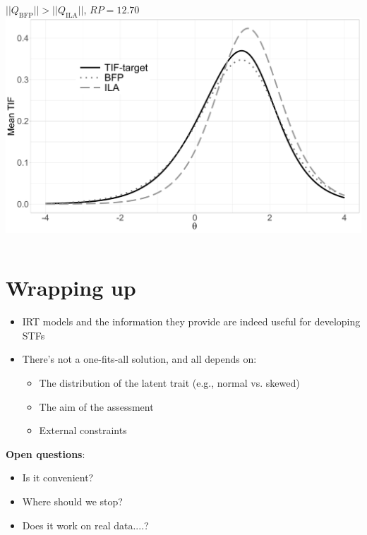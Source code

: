 \documentclass[aspectratio=149, compress]{beamer}
\begin{document}
\begin{frame}
\begin{columns}[T]
\begin{column}{.50\linewidth}
			
			\centering
			\footnotesize{$||Q_{\text{BFP}}|| > ||Q_{\text{ILA}}||$, $RP=12.70$}
			\includegraphics[width=.80\linewidth]{img/lessFar.pdf}	
			
			
		\end{column}
	\end{columns}
	
	
\end{frame}

\section{Wrapping up}


\begin{frame}
	\begin{itemize}
		\item IRT models and the information they provide are indeed useful for developing STFs
		\item There's not a one-fits-all solution, and all depends on: 
		\begin{itemize}
			\item The distribution of the latent trait (e.g., normal vs. skewed) 
			\item The aim of the assessment
			\item External constraints
		\end{itemize}
	\end{itemize}
	
	\textbf{Open questions}: 
	\begin{itemize}
		\item Is it convenient? 
		\item Where should we stop?
		\item Does it work on real data....?
	\end{itemize}
\end{frame}
\end{document}
